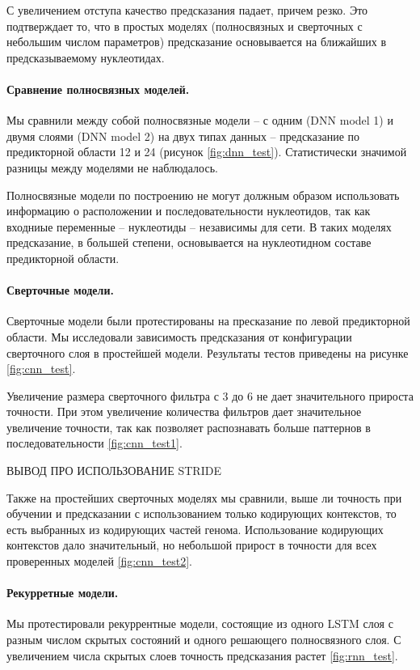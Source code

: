 С увеличением отступа качество предсказания падает, причем резко. Это подтверждает то, что в простых моделях (полносвязных и сверточных с небольшим числом параметров) предсказание основывается на ближайших в предсказываемому нуклеотидах.


 
 \paragraph{Сравнение полносвязных моделей.} Мы сравнили между собой полносвязные модели -- с одним (DNN model 1) и двумя слоями (DNN model 2)  на двух типах данных -- предсказание по предикторной области 12 и 24 (рисунок \ref{fig:dnn_test}). Статистически значимой разницы между моделями не наблюдалось.
 
 Полносвязные модели по построению не могут должным образом использовать информацию о расположении и последовательности нуклеотидов, так как входниые переменные -- нуклеотиды -- независимы для сети. В таких моделях предсказание, в большей степени, основывается на нуклеотидном составе предикторной области.
 



\paragraph{Сверточные модели.} Сверточные модели были протестированы на пресказание по левой предикторной области. Мы исследовали зависимость предсказания от конфигурации сверточного слоя в простейшей модели. Результаты тестов приведены на рисунке \ref{fig:cnn_test}.

Увеличение размера сверточного фильтра с 3 до 6 не дает значительного прироста точности. При этом увеличение количества фильтров дает значительное увеличение точности, так как позволяет распознавать больше паттернов в последовательности \ref{fig:cnn_test1}.

ВЫВОД ПРО ИСПОЛЬЗОВАНИЕ STRIDE	

Также на простейших сверточных моделях мы сравнили, выше ли точность при обучении и предсказании с использованием только кодирующих контекстов, то есть выбранных из кодирующих частей генома. Использование кодирующих контекстов дало значительный, но небольшой прирост в точности для всех проверенных моделей \ref{fig:cnn_test2}. 




\paragraph{Рекурретные модели.}
Мы протестировали рекуррентные модели, состоящие из одного LSTM слоя с разным числом скрытых состояний и одного решающего полносвязного слоя.
С увеличением числа скрытых слоев точность предсказания растет \ref{fig:rnn_test}.

